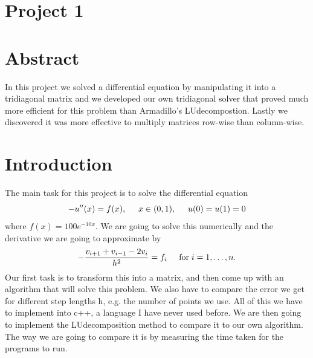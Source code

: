 \documentclass[12pt,a4wide]{article}
\begin{document}
\section*{Project 1}

\section*{Abstract}
In this project we solved a differential equation by manipulating it into a tridiagonal matrix and we developed our own tridiagonal solver that proved much more efficient for this problem than Armadillo's LUdecompostion.
Lastly we discovered it was more effective to multiply matrices row-wise than column-wise. 

\section*{Introduction}
The main task for this project is to solve the differential equation
\[
-u''(x) = f(x), \hspace{0.5cm} x\in(0,1), \hspace{0.5cm} u(0) = u(1) = 0
\]
where $f(x) = 100e^{-10x}$. We are going to solve this numerically and the derivative we are going to approximate by
\[
   -\frac{v_{i+1}+v_{i-1}-2v_i}{h^2} = f_i  \hspace{0.5cm} \mathrm{for} \hspace{0.1cm} i=1,\dots, n.
\]
Our first task is to transform this into a matrix, and then come up with an algorithm that will solve this
problem. We also have to compare the error we get for different step lengths h, e.g. the number of points we use.
All of this we have to implement into c++, a language I have never used before. 
We are then going to implement the LUdecomposition method to compare it to our own algorithm.
The way we are going to compare it is by measuring the time taken for the programs to run. 
\end{document}
